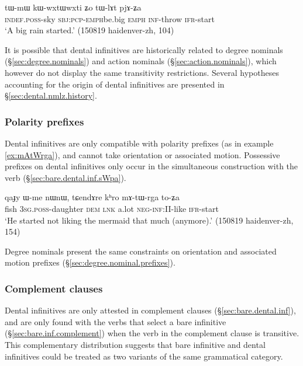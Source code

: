 \begin{exe}
\ex  \label{ex:tWlAt.pjAZa}
\gll tɯ-mɯ kɯ-wxtɯ\redp{}wxti ʑo tɯ-lɤt pjɤ-ʑa \\
\textsc{indef}.\textsc{poss}-sky \textsc{sbj}:\textsc{pcp}-\textsc{emph}\redp{}be.big \textsc{emph} \textsc{inf}-throw \textsc{ifr}-start \\
\glt `A big rain started.' (150819 haidenver-zh, 104)
\end{exe}

It is possible that dental infinitives are historically related to degree nominals (§\ref{sec:degree.nominals}) and action nominals (§\ref{sec:action.nominals}), which however do not display the same transitivity restrictions. Several hypotheses accounting for the origin of dental infinitives are presented in §\ref{sec:dental.nmlz.history}.

\subsubsection{Polarity prefixes} \label{sec:dental.inf.polarity}
Dental infinitives are only compatible with polarity prefixes (as in example \ref{ex:mAtWrga}), and cannot take orientation or associated motion. Possessive prefixes on dental infinitives only occur in the simultaneous construction with the verb  (§\ref{sec:bare.dental.inf.sWpa}).

\begin{exe}
\ex  \label{ex:mAtWrga}
\gll qaɟy ɯ-me nɯnɯ, tɕendɤre kʰro mɤ-tɯ-rga to-ʑa\\
fish \textsc{3sg}.\textsc{poss}-daughter \textsc{dem} \textsc{lnk} a.lot \textsc{neg}-\textsc{inf}:\textsc{II}-like \textsc{ifr}-start \\
\glt `He started not liking the mermaid that much (anymore).' (150819 haidenver-zh, 154)
\end{exe}

Degree nominals present the same constraints on orientation and associated motion prefixes (§\ref{sec:degree.nominal.prefixes}).

\subsubsection{Complement clauses} \label{sec:dental.inf.complement}
Dental  infinitives are only attested in complement clauses (§\ref{sec:bare.dental.inf}), and are only found with the verbs that select a bare infinitive (§\ref{sec:bare.inf.complement}) when the verb in the complement clause is transitive. This complementary distribution suggests that bare infinitive and dental infinitives could be treated as two variants of the same grammatical category.

